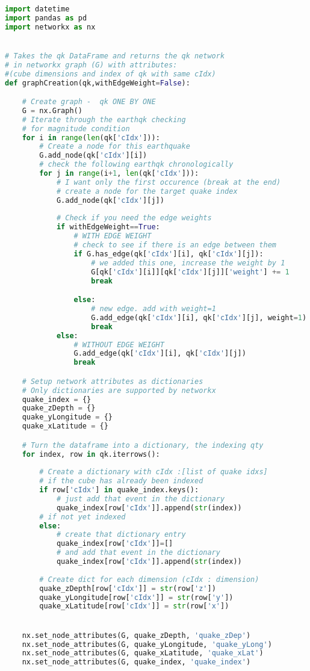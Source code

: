 \documentclass[12pt, twoside]{report}
\begin{document}
\begin{appendices}
\begin{lstlisting}[language=python, frame=single, tabsize=1] 
import datetime
import pandas as pd
import networkx as nx


# Takes the qk DataFrame and returns the qk network
# in networkx graph (G) with attributes:
#(cube dimensions and index of qk with same cIdx)
def graphCreation(qk,withEdgeWeight=False):

	# Create graph -  qk ONE BY ONE
	G = nx.Graph()
	# Iterate through the earthqk checking
	# for magnitude condition
	for i in range(len(qk['cIdx'])):
		# Create a node for this earthquake
		G.add_node(qk['cIdx'][i])
		# check the following earthqk chronologically
		for j in range(i+1, len(qk['cIdx'])):
			# I want only the first occurence (break at the end)
			# create a node for the target quake index
			G.add_node(qk['cIdx'][j])
			
			# Check if you need the edge weights
			if withEdgeWeight==True:
				# WITH EDGE WEIGHT
				# check to see if there is an edge between them
				if G.has_edge(qk['cIdx'][i], qk['cIdx'][j]):
					# we added this one, increase the weight by 1
					G[qk['cIdx'][i]][qk['cIdx'][j]]['weight'] += 1
					break

				else:
					# new edge. add with weight=1
					G.add_edge(qk['cIdx'][i], qk['cIdx'][j], weight=1)
					break
			else:
				# WITHOUT EDGE WEIGHT
				G.add_edge(qk['cIdx'][i], qk['cIdx'][j])
				break

	# Setup network attributes as dictionaries
	# Only dictionaries are supported by networkx
	quake_index = {}
	quake_zDepth = {}
	quake_yLongitude = {}
	quake_xLatitude = {}

	# Turn the dataframe into a dictionary, the indexing qty
	for index, row in qk.iterrows():
		
		# Create a dictionary with cIdx :[list of quake idxs]
		# if the cube has already been indexed
		if row['cIdx'] in quake_index.keys():
			# just add that event in the dictionary
			quake_index[row['cIdx']].append(str(index))
		# if not yet indexed
		else:
			# create that dictionary entry
			quake_index[row['cIdx']]=[]
			# and add that event in the dictionary
			quake_index[row['cIdx']].append(str(index))
			
		# Create dict for each dimension (cIdx : dimension)
		quake_zDepth[row['cIdx']] = str(row['z'])
		quake_yLongitude[row['cIdx']] = str(row['y'])
		quake_xLatitude[row['cIdx']] = str(row['x'])


	nx.set_node_attributes(G, quake_zDepth, 'quake_zDep')
	nx.set_node_attributes(G, quake_yLongitude, 'quake_yLong')
	nx.set_node_attributes(G, quake_xLatitude, 'quake_xLat')
	nx.set_node_attributes(G, quake_index, 'quake_index')



\end{lstlisting}
\end{appendices}
\end{document}
